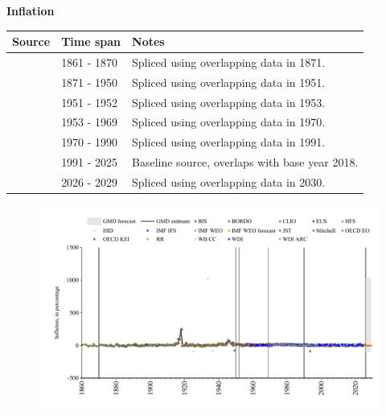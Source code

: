 \documentclass[12pt,a4paper,landscape]{article}
\begin{document}
\begin{adjustbox}{max totalsize={\paperwidth}{\paperheight},center}
\begin{minipage}[t][\textheight][t]{\textwidth}
\vspace*{0.5cm}
{}
\begin{center}
{\Large\bfseries Inflation}
\end{center}
\vspace{0.5cm}
\begin{table}[H]
\centering
\small
\begin{tabular}{|l|l|l|}
\hline
\textbf{Source} & \textbf{Time span} & \textbf{Notes} \\
\hline
\rowcolor{white}\cite{CLIO}& 1861 - 1870 &Spliced using overlapping data in 1871. \\
\rowcolor{lightgray}\cite{JST}& 1871 - 1950 &Spliced using overlapping data in 1951. \\
\rowcolor{white}\cite{IMF_IFS}& 1951 - 1952 &Spliced using overlapping data in 1953. \\
\rowcolor{lightgray}\cite{BIS}& 1953 - 1969 &Spliced using overlapping data in 1970. \\
\rowcolor{white}\cite{WB_CC}& 1970 - 1990 &Spliced using overlapping data in 1991. \\
\rowcolor{lightgray}\cite{OECD_EO}& 1991 - 2025 &Baseline source, overlaps with base year 2018. \\
\rowcolor{white}\cite{IMF_WEO_forecast}& 2026 - 2029 &Spliced using overlapping data in 2030. \\
\hline
\end{tabular}
\end{table}
\begin{figure}[H]
\centering
\includegraphics[width=\textwidth,height=0.6\textheight,keepaspectratio]{graphs/FIN_infl.pdf}
\end{figure}
\end{minipage}
\end{adjustbox}
\end{document}
